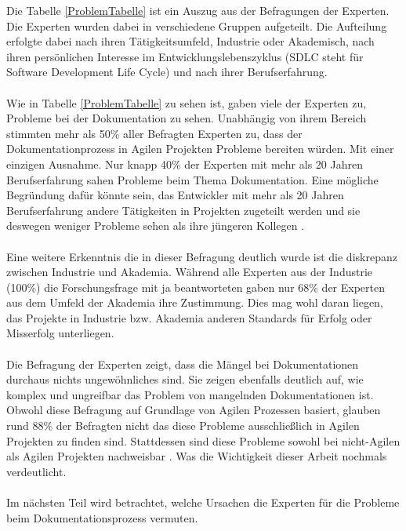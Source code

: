 \documentclass[a4paper,12pt]{scrartcl}
\begin{document}
Die Tabelle \ref{ProblemTabelle} ist ein Auszug aus der Befragungen der Experten. Die Experten wurden dabei in verschiedene Gruppen aufgeteilt. Die Aufteilung erfolgte dabei nach ihren Tätigkeitsumfeld, Industrie oder Akademisch, nach ihren persönlichen Interesse im Entwicklungslebenszyklus (SDLC steht für Software Development Life Cycle) und nach ihrer Berufserfahrung.
\\\\
Wie in Tabelle \ref{ProblemTabelle} zu sehen ist, gaben viele der Experten zu, Probleme bei der Dokumentation zu sehen. Unabhängig von ihrem Bereich stimmten mehr als 50\% aller Befragten Experten zu, dass der Dokumentationprozess in Agilen Projekten Probleme bereiten würden. Mit einer einzigen Ausnahme. Nur knapp 40\% der Experten mit mehr als 20 Jahren Berufserfahrung sahen Probleme beim Thema Dokumentation. Eine mögliche Begründung dafür könnte sein, das Entwickler mit mehr als 20 Jahren Berufserfahrung andere Tätigkeiten in Projekten zugeteilt werden und sie deswegen weniger Probleme sehen als ihre jüngeren Kollegen \cite{Prause2012}.
\\\\
Eine weitere Erkenntnis die in dieser Befragung deutlich wurde ist die diskrepanz zwischen Industrie und Akademia. Während alle Experten aus der Industrie (100\%) die Forschungsfrage mit ja beantworteten gaben nur 68\% der Experten aus dem Umfeld der Akademia ihre Zustimmung. Dies mag wohl daran liegen, das Projekte in Industrie bzw. Akademia anderen Standards für Erfolg oder Misserfolg unterliegen.
\\\\
Die Befragung der Experten zeigt, dass die Mängel bei Dokumentationen durchaus nichts ungewöhnliches sind. Sie zeigen ebenfalls deutlich auf, wie komplex und ungreifbar das Problem von mangelnden Dokumentationen ist. Obwohl diese Befragung auf Grundlage von Agilen Prozessen basiert, glauben rund 88\% der Befragten nicht das diese Probleme ausschließlich in Agilen Projekten zu finden sind. Stattdessen sind diese Probleme sowohl bei nicht-Agilen als Agilen Projekten nachweisbar \cite{Prause2012}. Was die Wichtigkeit dieser Arbeit nochmals verdeutlicht.
\\\\
Im nächsten Teil wird betrachtet, welche Ursachen die Experten für die Probleme beim Dokumentationsprozess vermuten.
\end{document}
